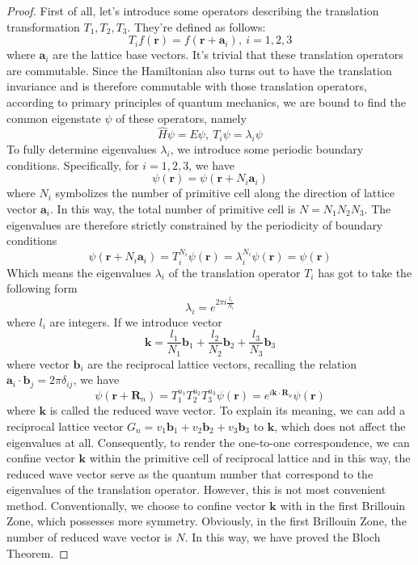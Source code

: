 \documentclass{article}
\begin{document}
\begin{proof} First of all, let's introduce some operators describing the translation transformation $T_1,T_2,T_3$. They're defined as follows:\begin{equation}
    T_{i}f(\mathbf{r})=f(\mathbf{r}+\mathbf{a}_i),~i=1,2,3
\end{equation}
where $\mathbf{a}_i$ are the lattice base vectors. It's trivial that these translation operators are commutable. Since the Hamiltonian also turns out to have the translation invariance and is therefore commutable with those translation operators, according to primary principles of quantum mechanics, we are bound to find the common eigenstate $\psi$ of these operators, namely\begin{equation}
    \hat{H}\psi=E\psi,~T_i\psi=\lambda_i\psi
\end{equation}
To fully determine eigenvalues $\lambda_i$, we introduce some periodic boundary conditions. Specifically, for $i=1,2,3$, we have\begin{equation}
    \psi(\mathbf{r})=\psi(\mathbf{r}+N_i\mathbf{a}_i)
\end{equation}
where $N_i$ symbolizes the number of primitive cell along the direction of lattice vector $\mathbf{a}_i$. In this way, the total number of primitive cell is $N=N_1N_2N_3$. The eigenvalues are therefore strictly constrained by the periodicity of boundary conditions\begin{equation}
    \psi(\mathbf{r}+N_i\mathbf{a}_i)=T_i^{N_i}\psi(\mathbf{r})=\lambda_i^{N_i}\psi(\mathbf{r})=\psi(\mathbf{r})
\end{equation}
Which means the eigenvalues $\lambda_i$ of the translation operator $T_i$ has got to take the following form\begin{equation}
    \lambda_i=e^{2\pi{i}\frac{l_i}{N_i}}
\end{equation}
where $l_i$ are integers. If we introduce vector\begin{equation}
    \mathbf{k}=\frac{l_1}{N_1}\mathbf{b}_1+\frac{l_2}{N_2}\mathbf{b}_2+\frac{l_3}{N_3}\mathbf{b}_3
\end{equation}
where vector $\mathbf{b}_i$ are the reciprocal lattice vectors, recalling the relation $\mathbf{a}_i\cdot\mathbf{b}_j=2\pi\delta_{ij}$, we have\begin{equation}
    \psi(\mathbf{r}+\mathbf{R}_n)=T_1^{u_1}T_2^{u_2}T_3^{u_3}\psi(\mathbf{r})=e^{i\mathbf{k}\cdot\mathbf{R}_n}\psi(\mathbf{r})
\end{equation}
where $\mathbf{k}$ is called the reduced wave vector. To explain its meaning, we can add a reciprocal lattice vector $G_n=v_1\mathbf{b}_1+v_2\mathbf{b}_2+v_3\mathbf{b}_3$ to $\mathbf{k}$, which does not affect the eigenvalues at all. Consequently, to render the one-to-one correspondence, we can confine vector $\mathbf{k}$ within the primitive cell of reciprocal lattice and in this way, the reduced wave vector serve as the quantum number that correspond to the eigenvalues of the translation operator. However, this is not most convenient method. Conventionally, we choose to confine vector $\mathbf{k}$ with in the first Brillouin Zone, which possesses more symmetry. Obviously, in the first Brillouin Zone, the number of reduced wave vector is $N$. In this way, we have proved the Bloch Theorem.

\end{proof}
\end{document}
